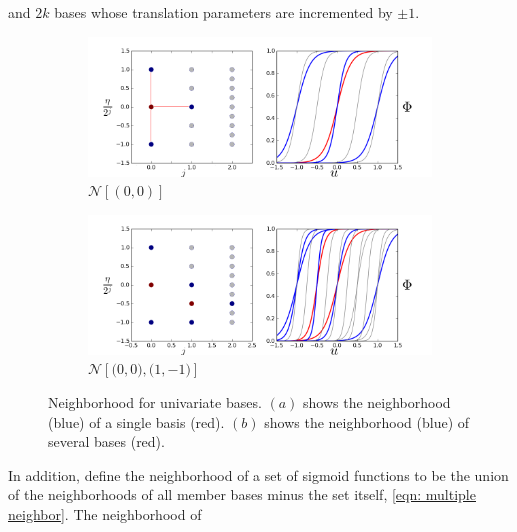 and $2k$ bases whose translation parameters are incremented by $\pm 1$.
\begin{figure}[Htbp]\begin{center}
    \begin{subfigure}[p]{1.\textwidth}
        \centering
        \includegraphics[width=10cm]{../basis_neighbor.png}
        \caption{$\mathcal{N}\left[\left(0,0\right)\right]$}
        \label{fig: basis neighbor}
    \end{subfigure}
    \begin{subfigure}[p]{1.\textwidth}
        \centering
        \includegraphics[width=10cm]{../basis_neighbor_2.png}
        \caption{$\mathcal{N}\left[ \big(0, 0\big), \big(1, -1\big)
                 \right]$}
        \label{fig: union neighbor}
    \end{subfigure}
    \caption{Neighborhood for univariate bases. 
             $(a)$ shows the neighborhood (blue)
             of a single basis (red).  $(b)$ shows the neighborhood (blue) 
             of several bases (red).}
\end{center}\end{figure}
In addition, define the neighborhood of a set of sigmoid functions to be the union
of the neighborhoods of all member bases minus the set itself, 
\eqref{eqn: multiple neighbor}. The neighborhood of 
